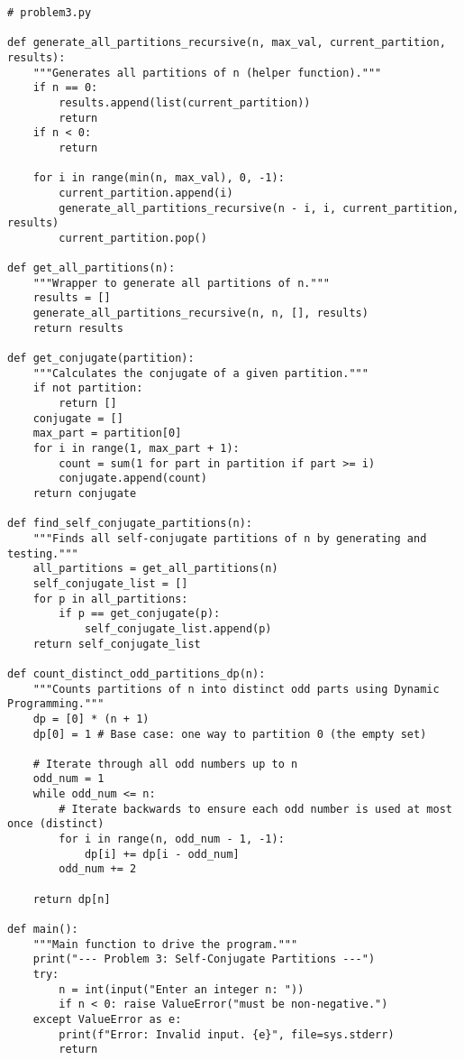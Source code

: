 \documentclass[a4paper,12pt]{article}
\begin{document}
\begin{lstlisting}[style=pythonstyle, caption={Self-conjugate and Distinct-Odd Partitions in Python.}, label={lst:python_self_conj}]
# problem3.py

def generate_all_partitions_recursive(n, max_val, current_partition, results):
    """Generates all partitions of n (helper function)."""
    if n == 0:
        results.append(list(current_partition))
        return
    if n < 0:
        return

    for i in range(min(n, max_val), 0, -1):
        current_partition.append(i)
        generate_all_partitions_recursive(n - i, i, current_partition, results)
        current_partition.pop()

def get_all_partitions(n):
    """Wrapper to generate all partitions of n."""
    results = []
    generate_all_partitions_recursive(n, n, [], results)
    return results

def get_conjugate(partition):
    """Calculates the conjugate of a given partition."""
    if not partition:
        return []
    conjugate = []
    max_part = partition[0]
    for i in range(1, max_part + 1):
        count = sum(1 for part in partition if part >= i)
        conjugate.append(count)
    return conjugate

def find_self_conjugate_partitions(n):
    """Finds all self-conjugate partitions of n by generating and testing."""
    all_partitions = get_all_partitions(n)
    self_conjugate_list = []
    for p in all_partitions:
        if p == get_conjugate(p):
            self_conjugate_list.append(p)
    return self_conjugate_list

def count_distinct_odd_partitions_dp(n):
    """Counts partitions of n into distinct odd parts using Dynamic Programming."""
    dp = [0] * (n + 1)
    dp[0] = 1 # Base case: one way to partition 0 (the empty set)
    
    # Iterate through all odd numbers up to n
    odd_num = 1
    while odd_num <= n:
        # Iterate backwards to ensure each odd number is used at most once (distinct)
        for i in range(n, odd_num - 1, -1):
            dp[i] += dp[i - odd_num]
        odd_num += 2
        
    return dp[n]

def main():
    """Main function to drive the program."""
    print("--- Problem 3: Self-Conjugate Partitions ---")
    try:
        n = int(input("Enter an integer n: "))
        if n < 0: raise ValueError("must be non-negative.")
    except ValueError as e:
        print(f"Error: Invalid input. {e}", file=sys.stderr)
        return


\end{lstlisting}
\end{document}
